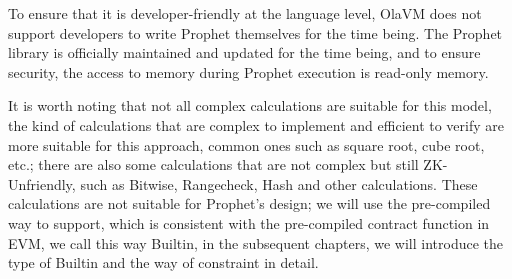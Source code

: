 To ensure that it is developer-friendly at the language level, OlaVM does not support developers to write Prophet themselves for the time being.
The Prophet library is officially maintained and updated for the time being, and to ensure security, the access to memory during Prophet execution is read-only memory.

It is worth noting that not all complex calculations are suitable for this model, the kind of calculations that are complex to implement and efficient to verify are more suitable for this approach, common ones such as square root, cube root, etc.; there are also some calculations that are not complex but still ZK-Unfriendly, such as Bitwise, Rangecheck, Hash and other calculations.
These calculations are not suitable for Prophet's design; we will use the pre-compiled way to support, which is consistent with the pre-compiled contract function in EVM, we call this way Builtin, in the subsequent chapters, we will introduce the type of Builtin and the way of constraint in detail.
